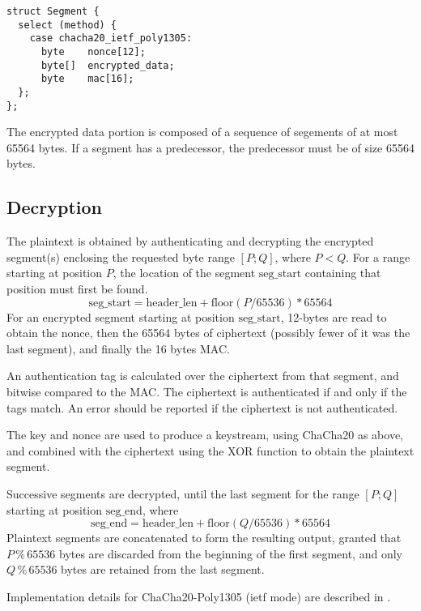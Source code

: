 \begin{verbatim}
struct Segment {
  select (method) {
    case chacha20_ietf_poly1305:
      byte    nonce[12];
      byte[]  encrypted_data;
      byte    mac[16];
  };
};
\end{verbatim}

The encrypted data portion is composed of a sequence of segements of at most 65564 bytes. If a segment has a predecessor, the predecessor must be of size 65564 bytes.

\subsection{Decryption}
The plaintext is obtained by authenticating and decrypting the encrypted segment(s) enclosing the requested byte range $[P;Q]$, where $P<Q$.
%
For a range starting at position $P$, the location of the segment $\text{seg\_start}$ containing that position must first be found.
%
$$\text{seg\_start} = \text{header\_len} + \text{floor}(P/65536) * 65564$$
%
For an encrypted segment starting at position $\text{seg\_start}$, 12-bytes are read to obtain the nonce, then the 65564 bytes of ciphertext (possibly fewer of it was the last segment), and finally the 16 bytes MAC.

An authentication tag is calculated over the ciphertext from that segment, and bitwise compared to the MAC. The ciphertext is authenticated if and only if the tags match.
%
An error should be reported if the ciphertext is not authenticated.

The key and nonce are used to produce a keystream, using ChaCha20 as above, and combined with the ciphertext using the XOR function to obtain the plaintext segment.

Successive segments are decrypted, until the last segment for the range $[P;Q]$ starting at position $\text{seg\_end}$, where %
%
$$\text{seg\_end} = \text{header\_len} + \text{floor}(Q/65536) * 65564$$
%
Plaintext segments are concatenated to form the resulting output, granted that $P \mathbin{\%} 65536$ bytes are discarded from the beginning of the first segment, and only $Q \mathbin{\%} 65536$ bytes are retained from the last segment.

Implementation details for ChaCha20-Poly1305 (ietf mode) are described in \cite{RFC8439}.
